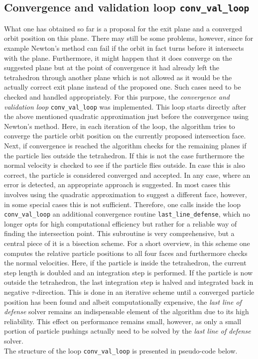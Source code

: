 \documentclass[./main.tex]{subfiles}
\begin{document}
\subsection{Convergence and validation loop \texttt{conv\_val\_loop}}
What one has obtained so far is a proposal for the exit plane and a converged orbit position on this plane. There may still be some problems, however, since for example Newton's method can fail if the orbit in fact turns before it intersects with the plane. Furthermore, it might happen that it does converge on the suggested plane but at the point of convergence it had already left the tetrahedron through another plane which is not allowed as it would be the actually correct exit plane instead of the proposed one. Such cases need to be checked and handled appropriately. For this purpose, the \textit{convergence and validation loop} \texttt{conv\_val\_loop} was implemented. This loop starts directly after the above mentioned quadratic approximation just before the convergence using Newton's method. Here, in each iteration of the loop, the algorithm tries to converge the particle orbit position on the currently proposed intersection face. Next, if convergence is reached the algorithm checks for the remaining planes if the particle lies outside the tetrahedron. If this is not the case furthermore the normal velocity is checked to see if the particle flies outside. In case this is also correct, the particle is considered converged and accepted. In any case, where an error is detected, an appropriate approach is suggested. In most cases this involves using the quadratic approximation to suggest a different face, however, in some special cases this is not sufficient. Therefore, one calls inside the loop \texttt{conv\_val\_loop} an additional convergence routine \texttt{last\_line\_defense}, which no longer opts for high computational efficiency but rather for a reliable way of finding the intersection point. This subroutine is very comprehensive, but a central piece of it is a bisection scheme. For a short overview, in this scheme one computes the relative particle positions to all four faces and furthermore checks the normal velocities. Here, if the particle is inside the tetrahedron, the current step length is doubled and an integration step is performed. If the particle is now outside the tetrahedron, the last integration step is halved and integrated back in negative $\tau$-direction. This is done in an iterative scheme until a converged particle position has been found and albeit computationally expensive, the \textit{last line of defense} solver remains an indispensable element of the algorithm due to its high reliability. This effect on performance remains small, however, as only a small portion of particle pushings actually need to be solved by the \textit{last line of defense} solver. \\
The structure of the loop \texttt{conv\_val\_loop} is presented in pseudo-code below.
\end{document}

